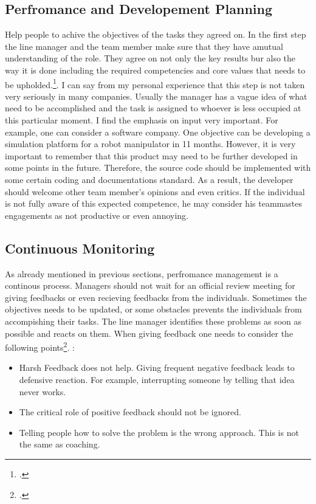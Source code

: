 \subsection{Perfromance and Developement Planning}
Help people to achive the objectives of the tasks they agreed on. In the first step the line manager and the team member make sure that they have amutual understanding of the role. They agree on not only the key results bur also the way it is done including the required competencies and core values that needs to be upholded.\footcite[See.][]{Armstrong2006}. 
 I can say from my personal experience that this step is not taken very seriously in many companies. Usually the manager has a vague idea of what need to be accomplished and the task is assigned to whoever is less occupied at this particular moment.  I find the emphasis on input very important. For example, one can consider a software company. One objective can be developing a simulation platform for a robot manipulator in 11 months. However, it is very important to remember that this product may need to be further developed in some points in the future. Therefore, the source code should be implemented with some certain coding and documentations standard. As a result, the developer should welcome other team member's opinions and even critics. If the individual is not fully aware of this expected competence, he may consider his teammastes engagements as not productive or even annoying. 
\subsection{Continuous Monitoring}

As already mentioned in previous sections, perfromance management is a continous process. Managers should not wait for an official review meeting for giving feedbacks or even recieving feedbacks from the individuals. Sometimes the objectives needs to be updated, or some obstacles prevents the individuals from accompishing their tasks. The line manager identifies these problems as soon as possible and reacts on them. When giving feedback one needs to consider the following points\footcite[See.][]{Chappelow 2019}. : 
\begin{itemize}
 \item Harsh Feedback does not help. Giving frequent negative feedback leads to defensive reaction.  For example, interrupting someone by telling that idea never works.
\item The critical role of positive feedback should not be ignored.
\item Telling people how to solve the problem is the wrong approach.  This is not the same as coaching.
\end{itemize}


